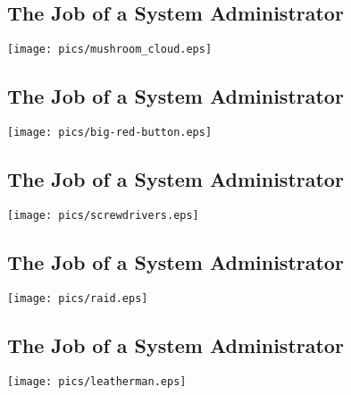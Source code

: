 \documentclass[xga]{xdvislides}
\begin{document}
\subsection{The Job of a System Administrator}
\vspace*{\fill}
\begin{center}
	\texttt{[image: pics/mushroom\_cloud.eps]} \\
\end{center}
\vspace*{\fill}

\subsection{The Job of a System Administrator}
\vspace*{\fill}
\begin{center}
	\texttt{[image: pics/big-red-button.eps]} \\
\end{center}
\vspace*{\fill}

\subsection{The Job of a System Administrator}
\vspace*{\fill}
\begin{center}
	\texttt{[image: pics/screwdrivers.eps]} \\
\end{center}
\vspace*{\fill}

\subsection{The Job of a System Administrator}
\vspace*{\fill}
\begin{center}
	\texttt{[image: pics/raid.eps]} \\
\end{center}
\vspace*{\fill}

\subsection{The Job of a System Administrator}
\vspace*{\fill}
\begin{center}
	\texttt{[image: pics/leatherman.eps]} \\
\end{center}
\vspace*{\fill}
\end{document}
